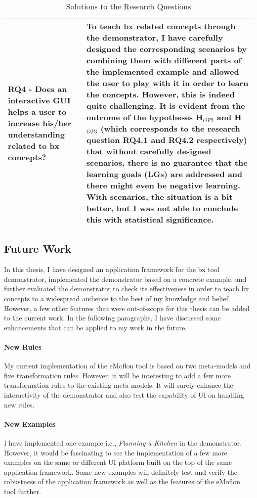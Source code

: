 \begin{table}
	\begin{tabular}{|p{5cm}|p{9.5cm}|}
		\hline	
		\textbf{RQ4 -} Does an interactive GUI helps a user to increase his/her understanding related to bx concepts? &
		To teach bx related concepts through the demonstrator, I have carefully designed the corresponding scenarios by combining them with different parts of the implemented example and allowed the user to play with it in order to learn the concepts. However, this is indeed quite challenging. It is evident from the outcome of the hypotheses H$_{OP2}$ and H$_{OP3}$ (which corresponds to the research question \textbf{RQ4.1} and \textbf{RQ4.2} respectively) that without carefully designed scenarios, there is no guarantee that the learning goals (\textbf{LG}s) are addressed and there might even be negative learning. With scenarios, the situation is a bit better, but I was not able to conclude this with statistical significance.\\
		\hline			
	\end{tabular}
	\caption{Solutions to the Research Questions}
	\label{tab:Solutions_ResearchQuestions}
\end{table}

\subsection{Future Work}\label{subsec:futurework}
In this thesis, I have designed an application framework for the bx tool demonstrator, implemented the demonstrator based on a concrete example, and further evaluated the demonstrator to check its effectiveness in order to teach bx concepts to a widespread audience to the best of my knowledge and belief. However, a few other features that were out-of-scope for this thesis can be added to the current work. In the following paragraphs, I have discussed some enhancements that can be applied to my work in the future.
 
\paragraph{New Rules}
My current implementation of the eMoflon tool is based on two meta-models and five transformation rules. However, it will be interesting to add a few more transformation rules to the existing meta-models. It will surely enhance the interactivity of the demonstrator and also test the capability of UI on handling new rules.

\paragraph{New Examples} I have implemented one example i.e., \textit{Planning a Kitchen} in the demonstrator. However, it would be fascinating to see the implementation of a few more examples on the same or different UI platform built on the top of the same application framework. Some new examples will definitely test and verify the robustness of the application framework as well as the features of the eMoflon tool further.

